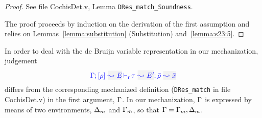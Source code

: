 {\centering
{}}
\begin{proof}
See file CochisDet.v, Lemma \texttt{DRes\_match\_Soundness}.

The proof proceeds by induction on the derivation of the first assumption and relies on Lemmas~\ref{lemma:substitution} (Substitution) and~\ref{lemma:s23:5}.
\end{proof}
In order to deal with the de Bruijn variable representation in our mechanization,
judgement
\begin{equation*}
  \dmres{\tenv}{\rulet}{E}{\type}{E'}{\ie{\ruleset}{\bar{x}}}
\end{equation*}
differs from the corresponding mechanized definition (\texttt{DRes\_match} in file CochisDet.v) in the first argument, $\Gamma$. In our mechanization, $\Gamma$ is expressed by means of two environments, $\Delta_m$ and $\Gamma_m$, so that $\Gamma = \Gamma_m,\Delta_m$.

{\centering
{}}


